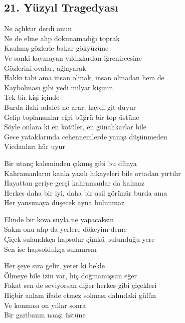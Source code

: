 \subsection{21. Yüzyıl Tragedyası}

Ne açlıktır derdi onun \\
Ne de eline alıp dokunamadığı toprak \\
Kısılmış gözlerle bakar gökyüzüne \\
Ve sanki kaymayan yıldızlardan iğrenircesine \\
Gözlerini ovalar, ağlayarak \\

\noindent\newline
Hakkı tabi ama insan olmak, insan olmadan hem de \\
Kaybolması gibi yedi milyar kişinin \\
Tek bir kişi içinde \\
Burda ilahi adalet ne arar, haydi git duyur \\
Gelip toplansınlar eğri büğrü bir top üstüne \\
Söyle onlara ki en kötüler, en günahkarlar bile \\
Gece yataklarında cehennemlerde yanışı düşünmeden \\
Vicdanları hür uyur

\noindent\newline
Bir utanç kaleminden çıkmış gibi bu dünya \\
Kahramanların kanla yazılı hikayeleri bile ortadan yırtılır \\
Hayattan geriye gerçi kahramanlar da kalmaz \\
Herkes daha bir iyi, daha bir asil görünür burda ama \\
Her yansımaya düşecek ayna bulunmaz

\noindent\newline
Elinde bir kova suyla ne yapacaksın \\
Sakın onu alıp da yerlere dökeyim deme \\
Çiçek sulandıkça hapsolur çünkü bulunduğu yere \\
Sen ise hapsoldukça sulanırsın

\noindent\newline
Her şeye sıra gelir, yeter ki bekle \\
Ölmeye bile izin var, hiç doğmamışsan eğer \\
Fakat sen de seviyorsan diğer herkes gibi çiçekleri \\
Hiçbir anlam ifade etmez solması dalındaki gülün \\
Ve konması on yıllar sonra \\
Bir garibanın naaşı üstüne

